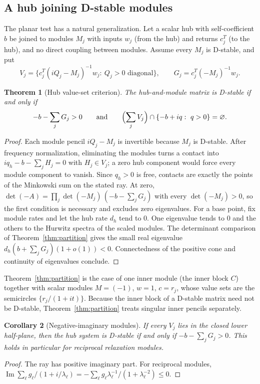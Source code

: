 \documentclass[11pt,a4paper]{article}
\theoremstyle{plain}
\newtheorem{theorem}{Theorem}[section]
\newtheorem{corollary}[theorem]{Corollary}
\theoremstyle{definition}
\theoremstyle{remark}
\newcommand{\Imag}{\operatorname{Im}}
\begin{document}
\subsection{A hub joining D-stable modules}
The planar test has a natural generalization. Let a scalar hub with
self-coefficient $b$ be joined to modules $M_j$ with inputs $w_j$ (from the
hub) and returns $c_j^{T}$ (to the hub), and no direct coupling between
modules. Assume every $M_j$ is D-stable, and put
\[
 V_j=\{c_j^{T}(iQ_j-M_j)^{-1}w_j:\ Q_j>0\text{ diagonal}\},\qquad
 G_j=c_j^{T}(-M_j)^{-1}w_j .
\]

\begin{theorem}[Hub value-set criterion]\label{thm:hub}
The hub-and-module matrix is D-stable if and only if
\[
 -b-\sum_jG_j>0\qquad\text{and}\qquad
 \Bigl(\sum_jV_j\Bigr)\cap\{-b+iq:\ q>0\}=\varnothing .
\]
\end{theorem}
\begin{proof}
Each module pencil $iQ_j-M_j$ is invertible because $M_j$ is D-stable. After
frequency normalization, eliminating the modules turns a contact into
$iq_h-b-\sum_jH_j=0$ with $H_j\in V_j$; a zero hub component would force every
module component to vanish. Since $q_h>0$ is free, contacts are exactly the
points of the Minkowski sum on the stated ray. At zero,
$\det(-A)=\prod_j\det(-M_j)\,(-b-\sum_jG_j)$ with every $\det(-M_j)>0$, so the
first condition is necessary and excludes zero eigenvalues. For a base point,
fix module rates and let the hub rate $d_h$ tend to $0$. One eigenvalue tends
to $0$ and the others to the Hurwitz spectra of the scaled modules. The
determinant comparison of Theorem~\ref{thm:partition} gives the small real
eigenvalue $d_h(b+\sum_jG_j)(1+o(1))<0$. Connectedness of the positive cone
and continuity of eigenvalues conclude.
\end{proof}

Theorem~\ref{thm:partition} is the case of one inner module (the inner block
$C$) together with scalar modules $M=(-1)$, $w=1$, $c=r_j$, whose value sets
are the semicircles $\{r_j/(1+it)\}$. Because the inner block of a D-stable
matrix need not be D-stable, Theorem~\ref{thm:partition} treats singular inner
pencils separately.

\begin{corollary}[Negative-imaginary modules]\label{cor:ni}
If every $V_j$ lies in the closed lower half-plane, then the hub system is
D-stable if and only if $-b-\sum_jG_j>0$. This holds in particular for
reciprocal relaxation modules.
\end{corollary}
\begin{proof}
The ray has positive imaginary part. For reciprocal modules,
$\Imag\sum_\ell g_\ell/(1+i/\lambda_\ell)=-\sum_\ell g_\ell\lambda_\ell^{-1}/(1+\lambda_\ell^{-2})\le0$.
\end{proof}
\end{document}
